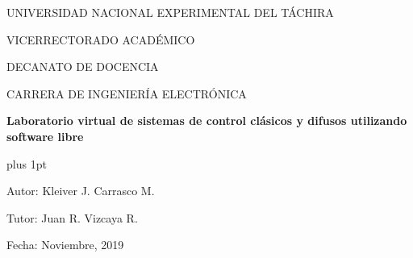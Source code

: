 \begin{center}
	\begin{spacing}{1}
		UNIVERSIDAD NACIONAL EXPERIMENTAL DEL TÁCHIRA
		
		VICERRECTORADO ACADÉMICO
		
		DECANATO DE DOCENCIA
		
		CARRERA DE INGENIERÍA ELECTRÓNICA
	
		\vspace{30pt}

		{\large \textbf{Laboratorio virtual de sistemas de control clásicos y difusos utilizando software libre}\par}
	
	\end{spacing}
\end{center}

\vspace{20pt}

\begin{flushright}
	\begin{spacing}{1}
		\parskip=0pt plus 1pt

		Autor: Kleiver J. Carrasco M.

		Tutor: Juan R. Vizcaya R.

		Fecha: Noviembre, 2019
		
	\end{spacing}	
\end{flushright}

\vspace{10pt}

\begin{abstract}
	\blindtext
	\blindtext
\end{abstract}

